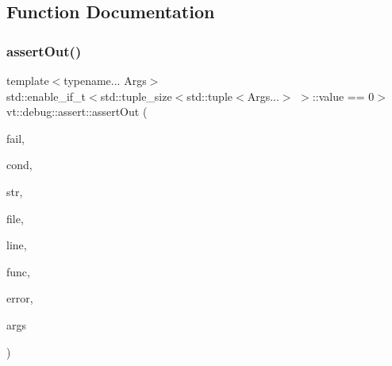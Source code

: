 \subsection{Function Documentation}
\mbox{\label{namespacevt_1_1debug_1_1assert_a1cefa1612d9e8d8c59e9908fc4011c5e}} 
\subsubsection{\texorpdfstring{assert\+Out()}{assertOut()}\hspace{0.1cm}{\footnotesize\ttfamily [1/3]}}
{\footnotesize\ttfamily template$<$typename... Args$>$ \\
std\+::enable\+\_\+if\+\_\+t$<$std\+::tuple\+\_\+size$<$std\+::tuple$<$Args...$>$ $>$\+::value == 0$>$ vt\+::debug\+::assert\+::assert\+Out (\begin{DoxyParamCaption}\item[{bool}]{fail,  }\item[{std\+::string const}]{cond,  }\item[{std\+::string const \&}]{str,  }\item[{std\+::string const \&}]{file,  }\item[{int const}]{line,  }\item[{std\+::string const \&}]{func,  }\item[{\hyperlink{namespacevt_a793764d753923abc3d32929870beb485}{Error\+Code\+Type}}]{error,  }\item[{std\+::tuple$<$ Args... $>$ \&\&}]{args }\end{DoxyParamCaption})\hspace{0.3cm}{\ttfamily [inline]}}

\mbox{\label{namespacevt_1_1debug_1_1assert_a4bc7c613ca106f6d3d7867389c4380d0}} 

